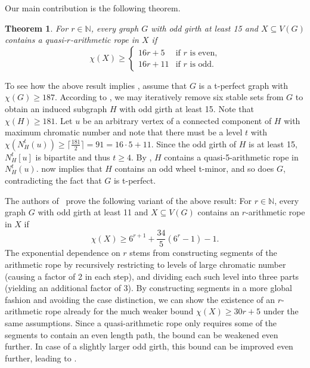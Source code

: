 \documentclass{article}
\newtheorem{theorem}{Theorem}[section]
\begin{document}
Our main contribution is the following theorem.

\begin{theorem}\label{thm:quasi_rope_existence}
    For $r \in \mathbb{N}$, every graph $G$ with odd girth at least 15 and $X \subseteq V(G)$ contains a quasi-$r$-arithmetic rope in $X$ if 
    \[\chi(X) \geq \begin{cases}
        16r + 5 & \text{if } r \text{ is even,}\\
        16r + 11 & \text{if } r \text{ is odd.}
    \end{cases}\]
\end{theorem}

To see how the above result implies , assume that $G$ is a t-perfect graph with $\chi(G) \geq 187$. According to , we may iteratively remove six stable sets from $G$ to obtain an induced subgraph $H$ with odd girth at least 15. Note that $\chi(H) \geq 181$. Let $u$ be an arbitrary vertex of a connected component of $H$ with maximum chromatic number and note that there must be a level $t$ with $\chi(N_H^t(u)) \geq \lceil \frac{181}{2} \rceil= 91 = 16\cdot 5 + 11$. Since the odd girth of $H$ is at least 15, $N_H^t[u]$ is bipartite and thus $t \geq 4$. By , $H$ contains a quasi-5-arithmetic rope in $N_H^t(u)$.  now implies that $H$ contains an odd wheel t-minor, and so does $G$, contradicting the fact that $G$ is t-perfect.

The authors of~\cite[Thm. 4.1]{chudnovsky2024colouringtperfectgraphs} prove the following variant of the above result:
For $r \in \mathbb{N}$, every graph $G$ with odd girth at least 11 and $X \subseteq V(G)$ contains an $r$-arithmetic rope in $X$ if 
\[ \chi(X) \geq 6^{r + 1} + \frac{34}{5} (6^r - 1) - 1.\]
The exponential dependence on $r$ stems from constructing segments of the arithmetic rope by recursively restricting to levels of large chromatic number (causing a factor of 2 in each step), and dividing each such level into three parts (yielding an additional factor of 3).
By constructing segments in a more global fashion and avoiding the case distinction, we can show the existence of an $r$-arithmetic rope already for the much weaker bound $\chi(X) \geq 30r + 5$ under the same assumptions.
Since a quasi-arithmetic rope only requires some of the segments to contain an even length path, the bound can be weakened even further.
In case of a slightly larger odd girth, this bound can be improved even further, leading to .
\end{document}
